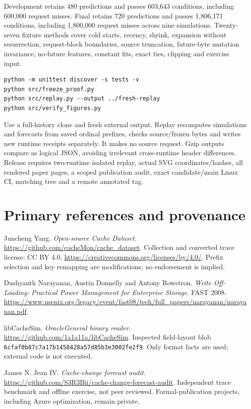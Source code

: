\documentclass[11pt]{article}
\newcommand{\MDevConditions}{603,643}
\newcommand{\MFinalConditions}{1,806,171}
\newcommand{\MDevPredictions}{480}
\newcommand{\MFinalPredictions}{720}
\begin{document}
Development retains \MDevPredictions{} predictions and passes \MDevConditions{} conditions, including 600,000 request misses. Final retains \MFinalPredictions{} predictions and passes \MFinalConditions{} conditions, including 1,800,000 request misses across nine simulations. Twenty-seven fixture methods cover cold starts, recency, shrink, expansion without resurrection, request-block boundaries, source truncation, future-byte mutation invariance, no-future features, constant fits, exact ties, clipping and exercise input.

\begin{verbatim}
python -m unittest discover -s tests -v
python src/freeze_proof.py
python src/replay.py --output ../fresh-replay
python src/verify_figures.py
\end{verbatim}
Use a full-history clone and fresh external output. Replay recomputes simulations and forecasts from saved ordinal prefixes, checks source/frozen bytes and writes new runtime receipts separately. It makes no source request. Gzip outputs compare as logical JSON, avoiding irrelevant cross-runtime header differences. Release requires two-runtime isolated replay, actual SVG coordinates/hashes, all rendered paper pages, a scoped publication audit, exact candidate/main Linux CI, matching tree and a remote annotated tag.

\section*{Primary references and provenance}
\small
Juncheng Yang. \emph{Open-source Cache Dataset}. \url{https://github.com/cacheMon/cache_dataset}. Collection and converted trace license: CC BY 4.0, \url{https://creativecommons.org/licenses/by/4.0/}. Prefix selection and key remapping are modifications; no endorsement is implied.

Dushyanth Narayanan, Austin Donnelly and Antony Rowstron. \emph{Write Off-Loading: Practical Power Management for Enterprise Storage}. FAST 2008. \url{https://www.usenix.org/legacy/event/fast08/tech/full_papers/narayanan/narayanan.pdf}.

libCacheSim. \emph{OracleGeneral binary reader}. \url{https://github.com/1a1a11a/libCacheSim}. Inspected field-layout blob \nolinkurl{6cfaf0b87c7a17b1458428a57d85b3e3002fe2f9}. Only format facts are used; external code is not executed.

James N. Jean IV. \emph{Cache-change forecast audit}. \url{https://github.com/S3R3Bii/cache-change-forecast-audit}. Independent trace benchmark and offline exercise, not peer reviewed. Formal-publication projects, including Azure optimization, remain private.
\end{document}

